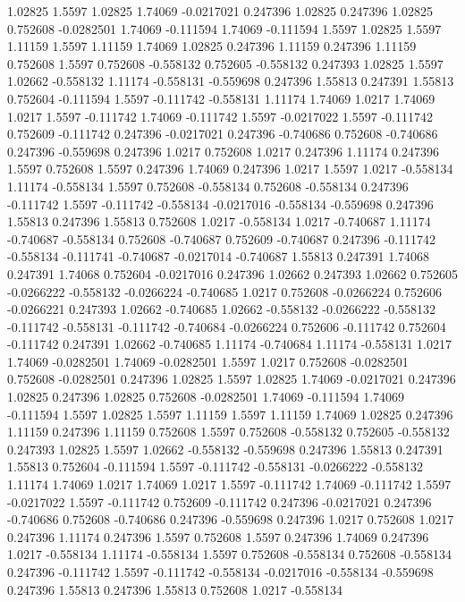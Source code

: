 1.02825 1.5597
1.02825 1.74069
-0.0217021 0.247396
1.02825 0.247396
1.02825 0.752608
-0.0282501 1.74069
-0.111594 1.74069
-0.111594 1.5597
1.02825 1.5597
1.11159 1.5597
1.11159 1.74069
1.02825 0.247396
1.11159 0.247396
1.11159 0.752608
1.5597 0.752608
-0.558132 0.752605
-0.558132 0.247393
1.02825 1.5597
1.02662 -0.558132
1.11174 -0.558131
-0.559698 0.247396
1.55813 0.247391
1.55813 0.752604
-0.111594 1.5597
-0.111742 -0.558131
1.11174 1.74069
1.0217 1.74069
1.0217 1.5597
-0.111742 1.74069
-0.111742 1.5597
-0.0217022 1.5597
-0.111742 0.752609
-0.111742 0.247396
-0.0217021 0.247396
-0.740686 0.752608
-0.740686 0.247396
-0.559698 0.247396
1.0217 0.752608
1.0217 0.247396
1.11174 0.247396
1.5597 0.752608
1.5597 0.247396
1.74069 0.247396
1.0217 1.5597
1.0217 -0.558134
1.11174 -0.558134
1.5597 0.752608
-0.558134 0.752608
-0.558134 0.247396
-0.111742 1.5597
-0.111742 -0.558134
-0.0217016 -0.558134
-0.559698 0.247396
1.55813 0.247396
1.55813 0.752608
1.0217 -0.558134
1.0217 -0.740687
1.11174 -0.740687
-0.558134 0.752608
-0.740687 0.752609
-0.740687 0.247396
-0.111742 -0.558134
-0.111741 -0.740687
-0.0217014 -0.740687
1.55813 0.247391
1.74068 0.247391
1.74068 0.752604
-0.0217016 0.247396
1.02662 0.247393
1.02662 0.752605
-0.0266222 -0.558132
-0.0266224 -0.740685
1.0217 0.752608
-0.0266224 0.752606
-0.0266221 0.247393
1.02662 -0.740685
1.02662 -0.558132
-0.0266222 -0.558132
-0.111742 -0.558131
-0.111742 -0.740684
-0.0266224 0.752606
-0.111742 0.752604
-0.111742 0.247391
1.02662 -0.740685
1.11174 -0.740684
1.11174 -0.558131
1.0217 1.74069
-0.0282501 1.74069
-0.0282501 1.5597
1.0217 0.752608
-0.0282501 0.752608
-0.0282501 0.247396
1.02825 1.5597
1.02825 1.74069
-0.0217021 0.247396
1.02825 0.247396
1.02825 0.752608
-0.0282501 1.74069
-0.111594 1.74069
-0.111594 1.5597
1.02825 1.5597
1.11159 1.5597
1.11159 1.74069
1.02825 0.247396
1.11159 0.247396
1.11159 0.752608
1.5597 0.752608
-0.558132 0.752605
-0.558132 0.247393
1.02825 1.5597
1.02662 -0.558132
-0.559698 0.247396
1.55813 0.247391
1.55813 0.752604
-0.111594 1.5597
-0.111742 -0.558131
-0.0266222 -0.558132
1.11174 1.74069
1.0217 1.74069
1.0217 1.5597
-0.111742 1.74069
-0.111742 1.5597
-0.0217022 1.5597
-0.111742 0.752609
-0.111742 0.247396
-0.0217021 0.247396
-0.740686 0.752608
-0.740686 0.247396
-0.559698 0.247396
1.0217 0.752608
1.0217 0.247396
1.11174 0.247396
1.5597 0.752608
1.5597 0.247396
1.74069 0.247396
1.0217 -0.558134
1.11174 -0.558134
1.5597 0.752608
-0.558134 0.752608
-0.558134 0.247396
-0.111742 1.5597
-0.111742 -0.558134
-0.0217016 -0.558134
-0.559698 0.247396
1.55813 0.247396
1.55813 0.752608
1.0217 -0.558134
